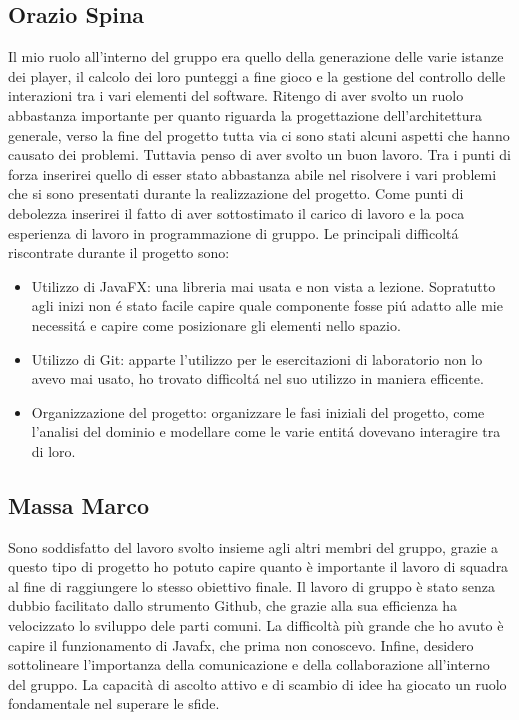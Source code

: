 \documentclass[a4paper,12pt]{report}
\begin{document}
\subsection{Orazio Spina}
Il mio ruolo all'interno del gruppo era quello della generazione delle varie istanze dei player, il calcolo dei loro punteggi a fine gioco e la gestione del controllo delle interazioni tra i vari elementi del software. Ritengo di aver svolto un ruolo abbastanza importante per quanto riguarda la progettazione dell'architettura generale, verso la fine del progetto tutta via ci sono stati alcuni aspetti che hanno causato dei problemi. Tuttavia penso di aver svolto un buon lavoro. Tra i punti di forza inserirei quello di esser stato abbastanza abile nel risolvere i vari problemi che si sono presentati durante la realizzazione del progetto. Come punti di debolezza inserirei il fatto di aver sottostimato il carico di lavoro e la poca esperienza di lavoro in programmazione di gruppo. Le principali difficoltá riscontrate durante il progetto sono:
\begin{itemize}
 \item Utilizzo di JavaFX: una libreria mai usata e non vista a lezione. Sopratutto agli inizi non é stato facile capire quale componente fosse piú adatto alle mie necessitá e capire come posizionare gli elementi nello spazio.
 \item Utilizzo di Git: apparte l'utilizzo per le esercitazioni di laboratorio non lo avevo mai usato, ho trovato difficoltá nel suo utilizzo in maniera efficente.
 \item Organizzazione del progetto: organizzare le fasi iniziali del progetto, come l'analisi del dominio e modellare come le varie entitá dovevano interagire tra di loro.
\end{itemize}
\subsection{Massa Marco}
Sono soddisfatto del lavoro svolto insieme agli altri membri del gruppo, grazie a questo tipo di progetto ho potuto capire quanto è importante il lavoro di squadra al fine di raggiungere lo stesso obiettivo finale. Il lavoro di gruppo è stato senza dubbio facilitato dallo strumento Github, che grazie alla sua efficienza ha velocizzato lo sviluppo dele parti comuni. La difficoltà più grande che ho avuto è capire il funzionamento di Javafx, che prima non conoscevo. Infine, desidero sottolineare l'importanza della comunicazione e della collaborazione all'interno del gruppo. La capacità di ascolto attivo e di scambio di idee ha giocato un ruolo fondamentale nel superare le sfide.
\end{document}
